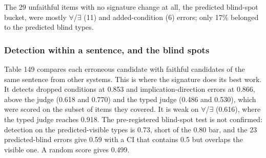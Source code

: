 \documentclass[11pt,letterpaper]{article}
\begin{document}
The 29 unfaithful items with no signature change at all, the predicted blind-spot bucket, were mostly $\forall$/$\exists$ (11) and added-condition (6) errors; only 17\% belonged to the predicted blind types.

\subsubsection{Detection within a sentence, and the blind spots}

Table 149 compares each erroneous candidate with faithful candidates of the same sentence from other systems. This is where the signature does its best work. It detects dropped conditions at 0.853 and implication-direction errors at 0.866, above the judge (0.618 and 0.770) and the typed judge (0.486 and 0.530), which were scored on the subset of items they covered. It is weak on $\forall$/$\exists$ (0.616), where the typed judge reaches 0.918. The pre-registered blind-spot test is not confirmed: detection on the predicted-visible types is 0.73, short of the 0.80 bar, and the 23 predicted-blind errors give 0.59 with a CI that contains 0.5 but overlaps the visible one. A random score gives 0.499.
\end{document}
